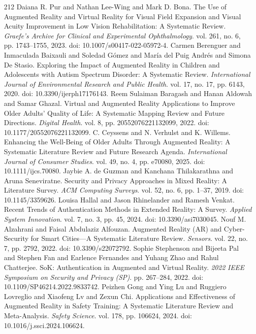 \begin{thebibliography}{212}
 Daiana R. Pur and Nathan Lee-Wing and Mark D. Bona. The Use of Augmented Reality and Virtual Reality for Visual Field Expansion and Visual Acuity Improvement in Low Vision Rehabilitation: A Systematic Review. \emph{Graefe's Archive for Clinical and Experimental Ophthalmology}. vol. 261, no. 6, pp. 1743--1755, 2023. doi: 10.1007/s00417-022-05972-4.
 Carmen Berenguer and Inmaculada Baixauli and Soledad G{\'o}mez and Mar{\'i}a del Puig Andr{\'e}s and Simona De Stasio. Exploring the Impact of Augmented Reality in Children and Adolescents with Autism Spectrum Disorder: A Systematic Review. \emph{International Journal of Environmental Research and Public Health}. vol. 17, no. 17, pp. 6143, 2020. doi: 10.3390/ijerph17176143.
 Reem Sulaiman Baragash and Hanan Aldowah and Samar Ghazal. Virtual and Augmented Reality Applications to Improve Older Adults' Quality of Life: A Systematic Mapping Review and Future Directions. \emph{Digital Health}. vol. 8, pp. 20552076221132099, 2022. doi: 10.1177/20552076221132099.
 C. Ceyssens and N. Verhulst and K. Willems. Enhancing the Well-Being of Older Adults Through Augmented Reality: A Systematic Literature Review and Future Research Agenda. \emph{International Journal of Consumer Studies}. vol. 49, no. 4, pp. e70080, 2025. doi: 10.1111/ijcs.70080.
 Jaybie A. de Guzman and Kanchana Thilakarathna and Aruna Seneviratne. Security and Privacy Approaches in Mixed Reality: A Literature Survey. \emph{ACM Computing Surveys}. vol. 52, no. 6, pp. 1--37, 2019. doi: 10.1145/3359626.
 Louisa Hallal and Jason Rhinelander and Ramesh Venkat. Recent Trends of Authentication Methods in Extended Reality: A Survey. \emph{Applied System Innovation}. vol. 7, no. 3, pp. 45, 2024. doi: 10.3390/asi7030045.
 Nouf M. Alzahrani and Faisal Abdulaziz Alfouzan. Augmented Reality ({AR}) and Cyber-Security for Smart Cities---A Systematic Literature Review. \emph{Sensors}. vol. 22, no. 7, pp. 2792, 2022. doi: 10.3390/s22072792.
 Sophie Stephenson and Bijeeta Pal and Stephen Fan and Earlence Fernandes and Yuhang Zhao and Rahul Chatterjee. {SoK}: Authentication in Augmented and Virtual Reality. \emph{2022 IEEE Symposium on Security and Privacy (SP)}. pp. 267--284, 2022. doi: 10.1109/SP46214.2022.9833742.
 Peizhen Gong and Ying Lu and Ruggiero Lovreglio and Xiaofeng Lv and Zexun Chi. Applications and Effectiveness of Augmented Reality in Safety Training: A Systematic Literature Review and Meta-Analysis. \emph{Safety Science}. vol. 178, pp. 106624, 2024. doi: 10.1016/j.ssci.2024.106624.

\end{thebibliography}

